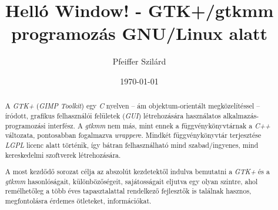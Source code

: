 \documentclass[a4paper,titlepage,10pt]{article}
\title{Helló Window! - GTK+/gtkmm programozás GNU/Linux alatt}
\author{Pfeiffer Szilárd}
\date{\today}
\begin{document}
\newcommand{\lstinputsources}[5][numbers=left]{
\medskip
\noindent
\begin{minipage}{\linewidth}
\begin{center}
\makebox[\linewidth]{
\makebox[5mm]{}

\makebox[10mm]{}

}

\end{center}
\end{minipage}
}

\newcommand{\lstinputsource}[4][]{
\medskip
\noindent
\begin{minipage}{\linewidth}
\begin{center}
\makebox[\linewidth]{

}

\end{center}
\end{minipage}
}

\newcommand{\lstinputsourcesappendix}[4][numbers=none]{
\noindent
\begin{center}
\begin{minipage}[t][\height][l]{0.57\linewidth}

\end{minipage}
\begin{minipage}[t][\height][r]{0.39\linewidth}

\end{minipage}
\end{center}
}


\begin{titlepage}

\maketitle

\begin{abstract}
A \textit{GTK+} (\textit{GIMP Toolkit}) egy \textit{C} nyelven -- ám objektum-orientált megközelítéssel -- íródott, grafikus felhasználói felületek (\textit{GUI}) létrehozására használatos alkalmazás-programozási interfész. A \textit{gtkmm} nem más, mint ennek a függvénykönyvtárnak a \textit{C++} változata, pontosabban fogalmazva \textit{wrapper}e. Mindkét függvénykönyvtár terjesztése \textit{LGPL} licenc alatt történik, így bátran felhasználható mind szabad/ingyenes, mind kereskedelmi szoftverek létrehozására.

A most kezdődő sorozat célja az abszolút kezdetektől indulva bemutatni a \textit{GTK+} és a \textit{gtkmm} hasonlóságait, különbözőségeit, sajátosságait eljutva egy olyan szintre, ahol remélhetőleg a több éves tapasztalattal rendelkező fejlesztők is találnak hasznos, megfontolásra érdemes ötleteket, információkat.
\end{abstract}

\tableofcontents

\end{titlepage}
\end{document}
